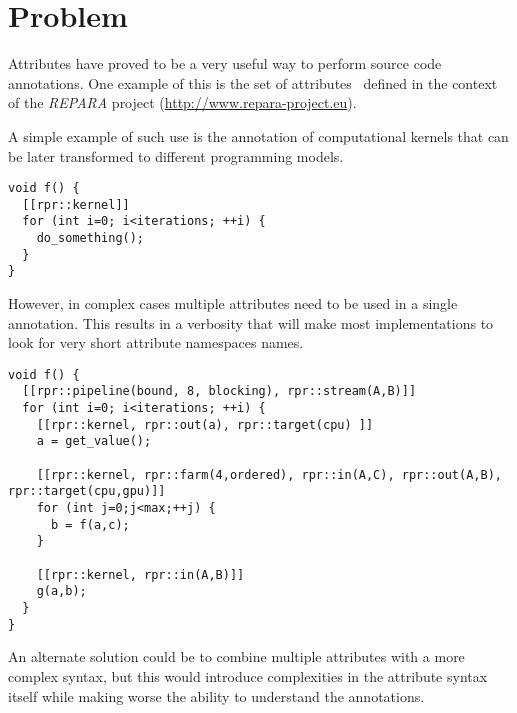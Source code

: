\section{Problem}

Attributes have proved to be a very useful way to perform
source code annotations. One example of this is the set
of attributes~\cite{repara:d33} defined in the context of the \emph{REPARA}
project (\url{http://www.repara-project.eu}).

A simple example of such use is the annotation of computational
kernels that can be later transformed to different
programming models.

\begin{lstlisting}
void f() {
  [[rpr::kernel]]
  for (int i=0; i<iterations; ++i) {
    do_something();
  }
}
\end{lstlisting}

However, in complex cases multiple attributes need to be
used in a single annotation. This results in a verbosity
that will make most implementations to look for very short
attribute namespaces names.

\begin{lstlisting}
void f() {
  [[rpr::pipeline(bound, 8, blocking), rpr::stream(A,B)]]
  for (int i=0; i<iterations; ++i) {
    [[rpr::kernel, rpr::out(a), rpr::target(cpu) ]]
    a = get_value();
    
    [[rpr::kernel, rpr::farm(4,ordered), rpr::in(A,C), rpr::out(A,B), rpr::target(cpu,gpu)]]
    for (int j=0;j<max;++j) {
      b = f(a,c);
    }

    [[rpr::kernel, rpr::in(A,B)]]
    g(a,b);
  }
}
\end{lstlisting}

An alternate solution could be to combine multiple attributes with a more
complex syntax, but this would introduce complexities in the attribute
syntax itself while making worse the ability to understand the annotations.
